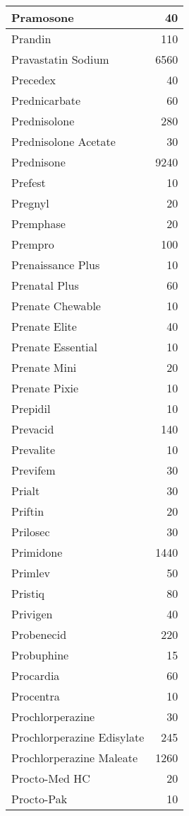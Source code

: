 \documentclass[
]{article}
\begin{document}
\begin{table}
\begin{tabular}[t]{l|r}
\hline
Pramosone & 40\\
\hline
Prandin & 110\\
\hline
Pravastatin Sodium & 6560\\
\hline
Precedex & 40\\
\hline
Prednicarbate & 60\\
\hline
Prednisolone & 280\\
\hline
Prednisolone Acetate & 30\\
\hline
Prednisone & 9240\\
\hline
Prefest & 10\\
\hline
Pregnyl & 20\\
\hline
Premphase & 20\\
\hline
Prempro & 100\\
\hline
Prenaissance Plus & 10\\
\hline
Prenatal Plus & 60\\
\hline
Prenate Chewable & 10\\
\hline
Prenate Elite & 40\\
\hline
Prenate Essential & 10\\
\hline
Prenate Mini & 20\\
\hline
Prenate Pixie & 10\\
\hline
Prepidil & 10\\
\hline
Prevacid & 140\\
\hline
Prevalite & 10\\
\hline
Previfem & 30\\
\hline
Prialt & 30\\
\hline
Priftin & 20\\
\hline
Prilosec & 30\\
\hline
Primidone & 1440\\
\hline
Primlev & 50\\
\hline
Pristiq & 80\\
\hline
Privigen & 40\\
\hline
Probenecid & 220\\
\hline
Probuphine & 15\\
\hline
Procardia & 60\\
\hline
Procentra & 10\\
\hline
Prochlorperazine & 30\\
\hline
Prochlorperazine Edisylate & 245\\
\hline
Prochlorperazine Maleate & 1260\\
\hline
Procto-Med HC & 20\\
\hline
Procto-Pak & 10\\
\hline

\end{tabular}
\end{table}
\end{document}
